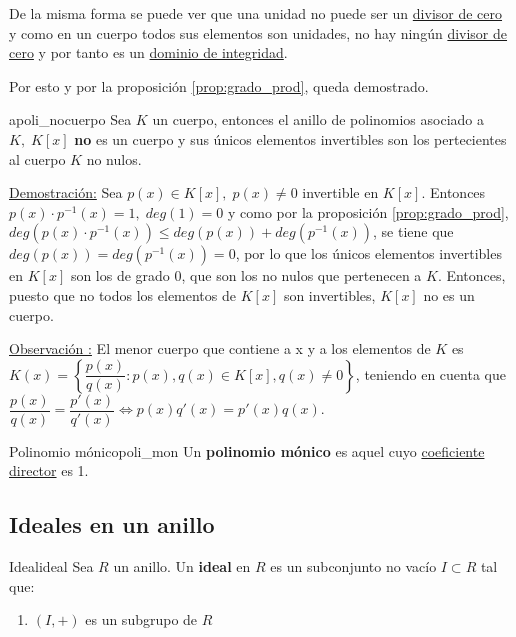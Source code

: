 \documentclass[10pt, a4paper]{article}
\newcommand{\obs}[1][\!\!]{ \underline{Observación #1:} }
\newcommand{\demo}{\underline{Demostración:} }
\begin{document}
De la misma forma se puede ver que una unidad no puede ser un \hyperref[def:div_cero]{divisor de cero} y como en un cuerpo todos sus elementos son unidades, no hay ningún \hyperref[def:div_cero]{divisor de cero} y por tanto es un \hyperref[def:DI]{dominio de integridad}.

Por esto y por la proposición \ref{prop:grado_prod}, queda demostrado.

\begin{proposition}{}{apoli_nocuerpo}
Sea $K$ un cuerpo, entonces el anillo de polinomios asociado a $K, \; K[x]$  \textbf{no} es un cuerpo y sus únicos elementos invertibles son los pertecientes al cuerpo $K$ no nulos.
\end{proposition}

\demo Sea $p(x) \in K[x], \; p(x) \neq 0$ invertible en $K[x]$. Entonces $p(x) \cdot p^{-1}(x) = 1, \; deg(1) = 0$ y como por la proposición \ref{prop:grado_prod}, $deg(p(x) \cdot p^{-1}(x)) \leq deg(p(x)) + deg(p^{-1}(x))$, se tiene que $deg(p(x)) = deg(p^{-1}(x)) = 0$, por lo que los únicos elementos invertibles en $K[x]$ son los de grado 0, que son los no nulos que pertenecen a $K$. Entonces, puesto que no todos los elementos de $K[x]$ son invertibles, $K[x]$ no es un cuerpo.

\vspace{3mm}

\obs El menor cuerpo que contiene a x y a los elementos de $K$ es \\ $K(x) = \left \{ \dfrac{p(x)}{q(x)} : p(x), q(x) \in K[x], q(x) \neq 0 \right \}$, teniendo en cuenta que $\dfrac{p(x)}{q(x)} = \dfrac{p'(x)}{q'(x)} \iff p(x) q'(x) = p'(x) q(x)$.

\begin{definition}{Polinomio mónico}{poli_mon}
Un \textbf{polinomio mónico} es aquel cuyo \hyperref[def:coef_dir]{coeficiente director} es 1.
\end{definition}

\subsection{Ideales en un anillo}

\vspace{3mm}

\begin{definition}{Ideal}{ideal}
Sea $R$ un anillo. Un \textbf{ideal} en $R$ es un subconjunto no vacío $I \subset R$ tal que:
\begin{enumerate}[label=\roman*)]
\item $(I, +)$ es un subgrupo de $R$
\end{enumerate}
\end{definition}
\end{document}
